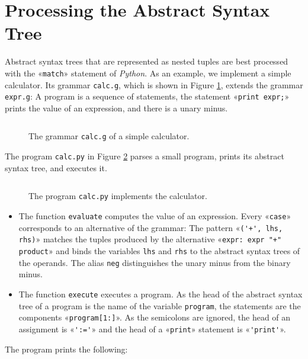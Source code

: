 \documentclass[11pt,a4paper]{article}
\newenvironment{unbreakable}{\par\noindent\begin{minipage}{\linewidth}}{\end{minipage}\par}
\newcommand{\codefigure}[5][]{\begin{figure}[H]%
  \inputminted[numbers = left, numbersep = 0.3cm, #1]{#2}{examples/#3}%
  \vspace*{-0.3cm}%
  \caption{#5}\label{#4}\end{figure}}
\newcommand{\grammarfile}[2]{\codefigure{larkita_lexer.py:LarkitaLexer}{#1}{fig:#1}{#2}}
\newcommand{\pythonfile}[2]{\codefigure{python3}{#1}{fig:#1}{#2}}
\newcommand{\resultfile}[2][\normalsize]{\begin{unbreakable}%
  \inputminted[fontsize = #1, breaklines]{text}{examples/output/#2.txt}\end{unbreakable}}
\begin{document}
\section{Processing the Abstract Syntax Tree}
Abstract syntax trees that are represented as nested tuples are best processed with the «\verb|match|»
statement of \textsl{Python}.  As an example, we implement a simple calculator.  Its grammar
\texttt{calc.g}, which is shown in Figure \ref{fig:calc.g}, extends the grammar \texttt{expr.g}:  A program
is a sequence of statements, the statement «\verb|print expr;|» prints the value of an expression, and there is
a unary minus.
\grammarfile{calc.g}{The grammar \texttt{calc.g} of a simple calculator.}
The program \texttt{calc.py} in Figure \ref{fig:calc.py} parses a small program, prints its abstract syntax
tree, and executes it.
\pythonfile{calc.py}{The program \texttt{calc.py} implements the calculator.}
\begin{itemize}
\item The function \texttt{evaluate} computes the value of an expression.  Every «\verb|case|» corresponds to an
      alternative of the grammar:  The pattern «\verb|('+', lhs, rhs)|» matches the tuples produced by the
      alternative «\verb|expr: expr "+" product|» and binds the variables \texttt{lhs} and \texttt{rhs} to the
      abstract syntax trees of the operands.  The alias \texttt{neg} distinguishes the unary minus from the
      binary minus.
\item The function \texttt{execute} executes a program.  As the head of the abstract syntax tree of a program
      is the name of the variable \texttt{program}, the statements are the components «\verb|program[1:]|».  As the
      semicolons are ignored, the head of an assignment is «\verb|':='|» and the head of a «\verb|print|»
      statement is «\verb|'print'|».
\end{itemize}
The program prints the following:
\resultfile{calc}
\end{document}
